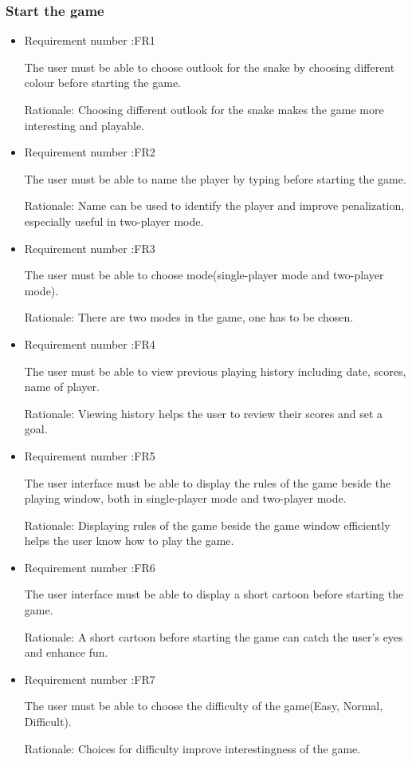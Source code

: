 \documentclass[12pt, titlepage]{article}
\begin{document}
\subsubsection{Start the game}
    \begin{itemize}
		\item Requirement number :FR1  
		
		 The user must be able to choose outlook for the snake by choosing different colour before starting the game.
		 
		Rationale: Choosing different outlook for the snake makes the game more interesting and playable.
		
		\item Requirement number :FR2
		
		The user must be able to name the player by typing before starting the game.
		
		Rationale: Name can be used to identify the player and improve penalization, especially useful in two-player mode.
		
		\item Requirement number :FR3
		
		The user must be able to choose mode(single-player mode and two-player mode).
		
		Rationale: There are two modes in the game, one has to be chosen.
		
		\item Requirement number :FR4
		
		The user must be able to view previous playing history including date, scores, name of player.
		
		Rationale: Viewing history helps the user to review their scores and set a goal. 
		
		\item Requirement number :FR5
		
		The user interface must be able to display the rules of the game beside the playing window, both in single-player mode and two-player mode.
		
		Rationale: Displaying rules of the game beside the game window efficiently helps the user know how to play the game.
		
		\item Requirement number :FR6
		
		The user interface must be able to display a short cartoon before starting the game.
		
		Rationale: A short cartoon before starting the game can catch the user's eyes and enhance fun.
		
		\item Requirement number :FR7
		
		The user must be able to choose the difficulty of the game(Easy, Normal, Difficult).
		
		Rationale: Choices for difficulty improve interestingness of the game.
	
	\end{itemize}
\end{document}
